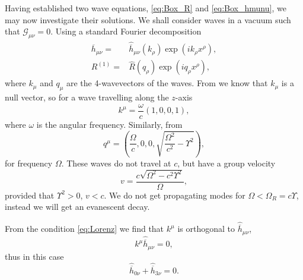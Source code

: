 Having established two wave equations, \eqref{eq:Box_R} and \eqref{eq:Box_hmunu}, we may now investigate their solutions. We shall consider waves in a vacuum such that $\mathcal{G}_{\mu\nu} = 0$. Using a standard Fourier decomposition
\begin{align}
\overline{h}_{\mu\nu} = {} & \widehat{\overline{h}}_{\mu\nu}(k_\rho) \exp\left(ik_\rho x^\rho\right),\\
R^{(1)} = {} & \widehat{R}(q_\rho) \exp\left(iq_\rho x^\rho\right),
\end{align}
where $k_\mu$ and $q_\mu$ are the 4-wavevectors of the waves. From  we know that $k_\mu$ is a null vector, so for a wave travelling along the $z$-axis
\begin{equation}
k^\mu = \frac{\omega}{c}(1, 0, 0, 1),
\end{equation}
where $\omega$ is the angular frequency. Similarly, from 
\begin{equation}
q^\mu = \left(\frac{\Omega}{c}, 0, 0, \sqrt{\frac{\Omega^2}{c^2} - \Upsilon^2}\right),
\label{eq:Ricci_q}
\end{equation}
for frequency $\Omega$. These waves do not travel at $c$, but have a group velocity
\begin{equation}
v = \frac{c\sqrt{\Omega^2 - c^2\Upsilon^2}}{\Omega},
\end{equation}
provided that $\Upsilon^2 > 0$, $v < c$. We do not get propagating modes for $\Omega < \Omega_R = c\Upsilon$, instead we will get an evanescent decay.

From the condition \eqref{eq:Lorenz} we find that $k^\mu$ is orthogonal to $\widehat{\overline{h}}_{\mu\nu}$,
\begin{equation}
k^\mu\widehat{\overline{h}}_{\mu\nu} = 0,
\end{equation}
thus in this case
\begin{equation}
\widehat{\overline{h}}_{0\nu} + \widehat{\overline{h}}_{3\nu} = 0.
\label{eq:Transverse}
\end{equation}

